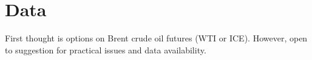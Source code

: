 \documentclass[12pt, a4paper]{article}
\begin{document}
 \section*{Data}
 First thought is options on Brent crude oil futures (WTI or ICE). However, open to suggestion for practical issues and data availability.


\end{document}
